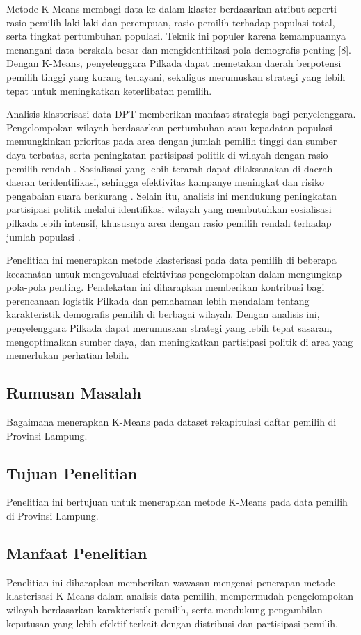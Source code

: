 Metode K-Means membagi data ke dalam klaster berdasarkan atribut seperti rasio pemilih laki-laki dan perempuan, rasio pemilih terhadap populasi total, serta tingkat pertumbuhan populasi. Teknik ini populer karena kemampuannya menangani data berskala besar dan mengidentifikasi pola demografis penting [8]. Dengan K-Means, penyelenggara Pilkada dapat memetakan daerah berpotensi pemilih tinggi yang kurang terlayani, sekaligus merumuskan strategi yang lebih tepat untuk meningkatkan keterlibatan pemilih.

Analisis klasterisasi data DPT memberikan manfaat strategis bagi penyelenggara. Pengelompokan wilayah berdasarkan pertumbuhan atau kepadatan populasi memungkinkan prioritas pada area dengan jumlah pemilih tinggi dan sumber daya terbatas, serta peningkatan partisipasi politik di wilayah dengan rasio pemilih rendah \cite{AnalisaCluster}. Sosialisasi yang lebih terarah dapat dilaksanakan di daerah-daerah teridentifikasi, sehingga efektivitas kampanye meningkat dan risiko pengabaian suara berkurang \cite{AnalisisDpt}. Selain itu, analisis ini mendukung peningkatan partisipasi politik melalui identifikasi wilayah yang membutuhkan sosialisasi pilkada lebih intensif, khususnya area dengan rasio pemilih rendah terhadap jumlah populasi \cite{ElectionParticipation}.

Penelitian ini menerapkan metode klasterisasi pada data pemilih di beberapa kecamatan untuk mengevaluasi efektivitas pengelompokan dalam mengungkap pola-pola penting. Pendekatan ini diharapkan memberikan kontribusi bagi perencanaan logistik Pilkada dan pemahaman lebih mendalam tentang karakteristik demografis pemilih di berbagai wilayah. Dengan analisis ini, penyelenggara Pilkada dapat merumuskan strategi yang lebih tepat sasaran, mengoptimalkan sumber daya, dan meningkatkan partisipasi politik di area yang memerlukan perhatian lebih.

\subsection{Rumusan Masalah}
Bagaimana menerapkan K-Means pada dataset rekapitulasi daftar pemilih di Provinsi Lampung.

\subsection{Tujuan Penelitian}
Penelitian ini bertujuan untuk menerapkan metode K-Means pada data pemilih di Provinsi Lampung.

\subsection{Manfaat Penelitian}
Penelitian ini diharapkan memberikan wawasan mengenai penerapan metode klasterisasi K-Means dalam analisis data pemilih, mempermudah pengelompokan wilayah berdasarkan karakteristik pemilih, serta mendukung pengambilan keputusan yang lebih efektif terkait dengan distribusi dan partisipasi pemilih.


